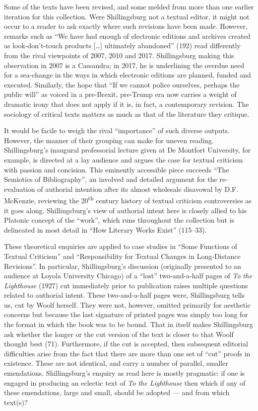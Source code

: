 \begin{review}
Some of the texts have been revised, and some melded from more than one
earlier iteration for this collection. Were Shillingsburg not a textual
editor, it might not occur to a reader to ask exactly where such
revisions have been made. However, remarks such as ``We have had enough
of electronic editions and archives created as look-don't-touch products
{[}\dots{}{]} ultimately abandoned'' (192) read differently from the rival
viewpoints of 2007, 2010 and 2017. Shillingsburg making this observation
in 2007 is a Cassandra; in 2017, he is underlining the overdue need for
a sea-change in the ways in which electronic editions are planned,
funded and executed. Similarly, the hope that ``If we cannot police
ourselves, perhaps the public will'' as voiced in a pre-Brexit,
pre-Trump era now carries a weight of dramatic irony that does not apply
if it is, in fact, a contemporary revision. The sociology of critical
texts matters as much as that of the literature they critique.

It would be facile to weigh the rival ``importance'' of such diverse
outputs. However, the manner of their grouping can make for uneven
reading. Shillingsburg's inaugural professorial lecture given at De
Montfort University, for example, is directed at a lay audience and
argues the case for textual criticism with passion and concision. This
eminently accessible piece succeeds ``The Semiotics of Bibliography'',
an involved and detailed argument for the re-evaluation of authorial intention
after its almost wholesale disavowal by D.F. McKenzie, reviewing the
20\textsuperscript{th} century history of textual criticism
controversies as it goes along. Shillingsburg's view of authorial intent
here is closely allied to his Platonic concept of the ``work'', which
runs throughout the collection but is delineated in most detail in ``How
Literary Works Exist'' (115--33).

These theoretical enquiries are applied to case studies in ``Some
Functions of Textual Criticism'' and ``Responsibility for Textual
Changes in Long-Distance Revisions''. In particular, Shillingsburg's
discussion (originally presented to an audience at Loyola University
Chicago) of a ``lost'' two-and-a-half pages of \emph{To the Lighthouse}
(1927) cut immediately prior to publication raises multiple questions
related to authorial intent. These two-and-a-half pages were,
Shillingsburg tells us, cut by Woolf herself. They were not, however,
omitted primarily for aesthetic concerns but because the last signature
of printed pages was simply too long for the format in which the book
was to be bound. That in itself makes Shillingsburg ask whether the
longer or the cut version of the text is closer to that Woolf thought
best (71). Furthermore, if the cut is accepted, then subsequent
editorial difficulties arise from the fact that there are more than one
set of ``cut'' proofs in existence. These are not identical, and carry a
number of parallel, smaller emendations. Shillingsburg's enquiry as read
here is mostly pragmatic: if one is engaged in producing an eclectic
text of \emph{To the Lighthouse} then which if any of these emendations,
large and small, should be adopted --- and from which text(s)?


\end{review}
